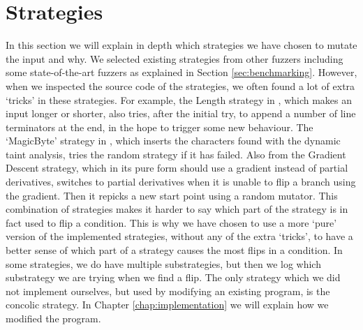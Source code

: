 


\section{Strategies}\label{sec:implement-strategies}
In this section we will explain in depth which strategies we have chosen to mutate the input and why. 
We selected existing strategies from other fuzzers including some state-of-the-art fuzzers as explained in Section \ref{sec:benchmarking}.
However, when we inspected the source code of the strategies, we often found a lot of extra `tricks' in these strategies. For example, the Length strategy in \cite{chen2018angora}, which makes an input longer or shorter, also tries, after the initial try, to append a number of line terminators at the end, in the hope to trigger some new behaviour.
The `MagicByte' strategy in \cite{chen2018angora}, which inserts the characters found with the dynamic taint analysis, tries the random strategy if it has failed. Also from \cite{chen2018angora} the Gradient Descent strategy, which in its pure form should use a gradient instead of partial derivatives, switches to partial derivatives when it is unable to flip a branch using the gradient. Then it repicks a new start point using a random mutator. This combination of strategies makes it harder to say which part of the strategy is in fact used to flip a condition.
This is why we have chosen to use a more `pure' version of the implemented strategies, without any of the extra `tricks', to have a better sense of which part of a strategy causes the most flips in a condition. In some strategies, we do have multiple substrategies, but then we log which substrategy we are trying when we find a flip.
The only strategy which we did not implement ourselves, but used by modifying an existing program, is the concolic strategy. In Chapter \ref{chap:implementation} we will explain how we modified the program.

